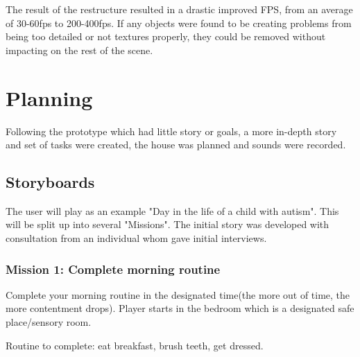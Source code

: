 \documentclass[11pt]{report}
\begin{document}
The result of the restructure resulted in a drastic improved FPS, from an average of 30-60fps to 200-400fps. If any objects were found to be creating problems from being too detailed or not textures properly, they could be removed without impacting on the rest of the scene.

\section{Planning}

Following the prototype which had little story or goals, a more in-depth story and set of tasks were created, the house was planned and sounds were recorded.

\subsection{Storyboards}
The user will play as an example "Day in the life of a child with autism". This will be split up into several "Missions". The initial story was developed with consultation from an individual whom gave initial interviews. 

\subsubsection*{Mission 1: Complete morning routine}
Complete your morning routine in the designated time(the more out of time, the more contentment drops). Player starts in the bedroom which is a designated safe place/sensory room. 

Routine to complete: eat breakfast, brush teeth, get dressed.
\end{document}
